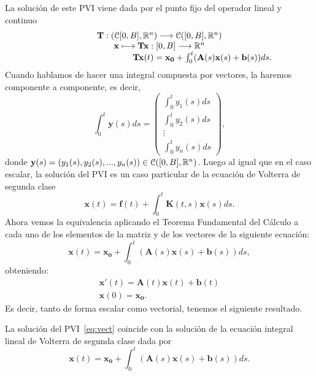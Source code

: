 La solución de este PVI viene dada por el punto fijo del operador lineal y continuo
\begin{equation}
	\begin{array}{c}
		\textbf{T}: (\mathcal{C}[0,B], \mathbb{R}^n) \longrightarrow \mathcal{C}([0,B],\mathbb{R}^n) \\  \textbf{x} \longmapsto \textbf{Tx}:[0,B] \longrightarrow \mathbb{R}^n \\  \qquad \qquad \qquad \qquad \qquad \textbf{Tx}(t)= \textbf{x}_\textbf{0} + \int_0^t (\textbf{A}(s)\textbf{x}(s)+\textbf{b}(s))ds.
	\end{array}
\end{equation}
Cuando hablamos de hacer una integral compuesta por vectores, la haremos componente a componente, es decir,
\begin{equation}
	\int_0^t \textbf{y}(s)ds = \begin{pmatrix}
	\displaystyle	\int_0^t y_1(s)ds \\ \displaystyle \int_0^t y_2(s)ds \\ \vdots \\ \displaystyle \int_0^t y_n(s)ds
	\end{pmatrix},
\end{equation}
donde $\textbf{y}(s) = (y_1(s),y_2(s),...,y_n(s)) \in \mathcal{C}([0,B],\mathbb{R}^n)$. Luego al igual que en el caso escalar, la solución del PVI es un caso particular de la ecuación de Volterra de segunda clase
\begin{equation}
	\textbf{x}(t) = \textbf{f}(t) + \int_0^t \textbf{K}(t,s)\textbf{x}(s)ds.
\end{equation}
Ahora vemos la equivalencia aplicando el Teorema Fundamental del Cálculo a cada uno de los elementos de la matriz y de los vectores de la siguiente ecuación:
\begin{equation}
	\textbf{x}(t)= \textbf{x}_\textbf{0} + \int_0^t (\textbf{A}(s)\textbf{x}(s)+\textbf{b}(s))ds,
\end{equation}
obteniendo:
\begin{equation}
	\begin{array}{c}
		\textbf{x}'(t) = \textbf{A}(t)\textbf{x}(t)+\textbf{b}(t) \\ \textbf{x}(0) = \textbf{x}_\textbf{0}.
	\end{array}
\end{equation}
Es decir, tanto de forma escalar como vectorial, tenemos el siguiente resultado.
\begin{corolario}
	La solución del PVI~\eqref{eq:vect} coincide con la solución de la ecuación integral lineal de Volterra de segunda clase dada por
	\begin{equation}
		\textbf{x}(t)= \textbf{x}_\textbf{0} + \int_0^t (\textbf{A}(s)\textbf{x}(s)+\textbf{b}(s))ds.
	\end{equation}
\end{corolario}

